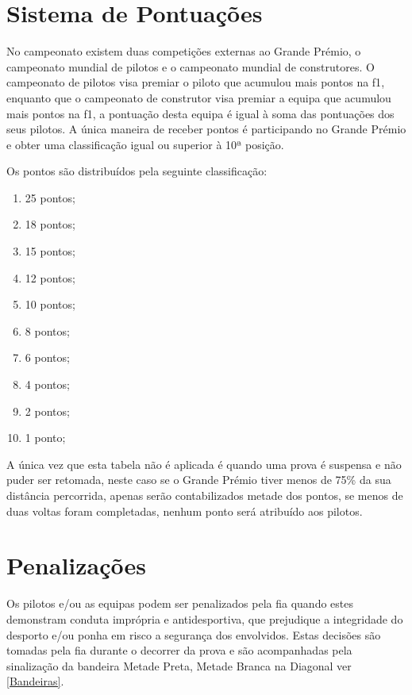 \documentclass{report}
\begin{document}
\section{Sistema de Pontuações}
\hspace{\parindent}No campeonato existem duas competições externas ao Grande Prémio, o campeonato mundial de pilotos e o campeonato mundial de construtores. O campeonato de pilotos visa premiar o piloto que acumulou mais pontos na \ac{f1}, enquanto que o campeonato de construtor visa premiar a equipa que acumulou mais pontos na \ac{f1}, a pontuação desta equipa é igual à soma das pontuações dos seus pilotos. A única maneira de receber pontos é participando no Grande Prémio e obter uma classificação igual ou superior à 10ª posição.

Os pontos são distribuídos pela seguinte classificação:
\begin{enumerate}
    \item 25 pontos;
    \item 18 pontos;
    \item 15 pontos;
    \item 12 pontos;
    \item 10 pontos;
    \item 8 pontos;
    \item 6 pontos;
    \item 4 pontos;
    \item 2 pontos;
    \item 1 ponto;
\end{enumerate}

A única vez que esta tabela não é aplicada é quando uma prova é suspensa e não puder ser retomada, neste caso se o Grande Prémio tiver menos de 75\% da sua distância percorrida, apenas serão contabilizados metade dos pontos, se menos de duas voltas foram completadas, nenhum ponto será atribuído aos pilotos.
\section{Penalizações}

Os pilotos e/ou as equipas podem ser penalizados pela \ac{fia} quando estes demonstram conduta imprópria e antidesportiva, que prejudique a integridade do desporto e/ou ponha em risco a segurança dos envolvidos. Estas decisões são tomadas pela \ac{fia} durante o decorrer da prova e são acompanhadas pela sinalização da bandeira Metade Preta, Metade Branca na Diagonal ver \ref{Bandeiras}.
\end{document}
